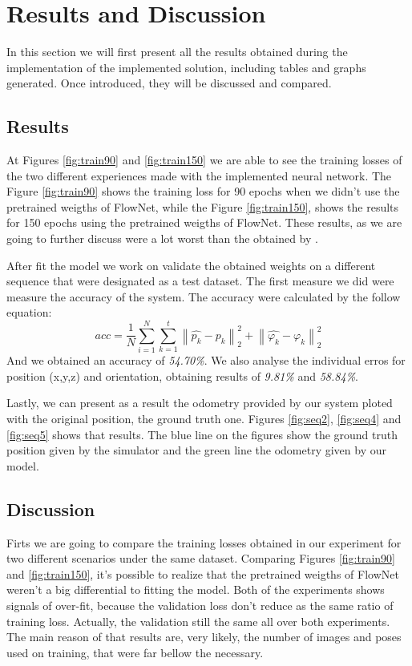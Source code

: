 \section{Results and Discussion} \label{sec:res-dic}
    In this section we will first present all the results obtained during the implementation of the implemented solution, including tables and graphs generated. Once introduced, they will be discussed and compared.
    
    \subsection{Results} \label{sec:resultados}
        At Figures \ref{fig:train90} and \ref{fig:train150} we are able to see the training losses of the two different experiences made with the implemented neural network. The Figure \ref{fig:train90} shows the training loss for 90 epochs when we didn't use the pretrained weigths of FlowNet, while the Figure \ref{fig:train150}, shows the results for 150 epochs using the pretrained weigths of FlowNet. These results, as we are going to further discuss were a lot worst than the obtained by \cite{wang2017deepvo}. 
        
        After fit the model we work on validate the obtained weights on a different sequence that were designated as a test dataset. The first measure we did were measure the accuracy of the system. The accuracy were calculated by the follow equation:
        \begin{equation}
            acc = \frac{1}{N} \sum_{i=1}^{N}\sum_{k=1}^{t} \left\| \hat{p_k} - p_k \right\|^{2}_2 + \left\| \hat{\varphi_k} - \varphi_k \right\|^{2}_2
        \end{equation}
        And we obtained an accuracy of \emph{54.70\%}. We also analyse the individual erros for position (x,y,z) and orientation, obtaining results of \emph{9.81\%} and \emph{58.84\%}.
        
        Lastly, we can present as a result the odometry provided by our system ploted with the original position, the ground truth one. Figures \ref{fig:seq2}, \ref{fig:seq4} and \ref{fig:seq5} shows that results. The blue line on the figures show the ground truth position given by the simulator and the green line the odometry given by our model.
        
    \subsection{Discussion} \label{sec:discussao}
        Firts we are going to compare the training losses obtained in our experiment for two different scenarios under the same dataset. Comparing Figures \ref{fig:train90} and \ref{fig:train150}, it's possible to realize that the pretrained weigths of FlowNet weren't a big differential to fitting the model. Both of the experiments shows signals of over-fit, because the validation loss don't reduce as the same ratio of training loss. Actually, the validation still the same all over both experiments. The main reason of that results are, very likely, the number of images and poses used on training, that were far bellow the necessary.
        
